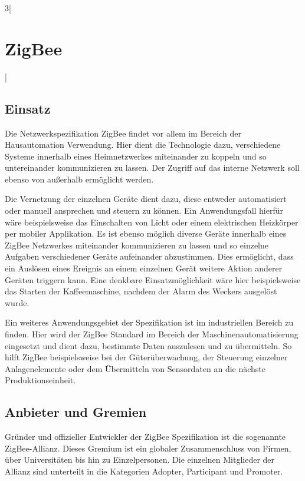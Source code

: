 \begin{multicols}{3}[\section{ZigBee}]
\subsection*{Einsatz}
Die Netzwerkspezifikation ZigBee findet vor allem im Bereich der Hausautomation Verwendung. Hier dient die Technologie dazu, verschiedene Systeme innerhalb eines Heimnetzwerkes miteinander zu koppeln und so untereinander kommunizieren zu lassen. Der Zugriff auf das interne Netzwerk soll ebenso von außerhalb ermöglicht werden. 
\par Die Vernetzung der einzelnen Geräte dient dazu, diese entweder automatisiert oder manuell ansprechen und steuern zu können. Ein Anwendungsfall hierfür wäre beispielsweise das Einschalten von Licht oder einem elektrischen Heizkörper per mobiler Applikation. Es ist ebenso möglich diverse Geräte innerhalb eines ZigBee Netzwerkes miteinander kommunizieren zu lassen und so einzelne Aufgaben verschiedener Geräte aufeinander abzustimmen. Dies ermöglicht, dass ein Auslösen eines Ereignis an einem einzelnen Gerät weitere Aktion anderer Geräten triggern kann. Eine denkbare Einsatzmöglichkeit wäre hier beispielsweise das Starten der Kaffeemaschine, nachdem der Alarm des Weckers ausgelöst wurde.  
\par Ein weiteres Anwendungsgebiet der Spezifikation ist im industriellen Bereich zu finden. Hier wird der ZigBee Standard im Bereich der Maschinenautomatisierung eingesetzt und dient dazu, bestimmte Daten auszulesen und zu übermitteln. So hilft ZigBee beispielsweise bei der Güterüberwachung, der Steuerung einzelner Anlagenelemente oder dem Übermitteln von Sensordaten an die nächste Produktionseinheit.~\cite{zigbee.10}

\subsection*{Anbieter und Gremien}
Gründer und offizieller Entwickler der ZigBee Spezifikation ist die sogenannte ZigBee-Allianz. Dieses Gremium ist ein globaler Zusammenschluss von Firmen, über Universitäten bis hin zu Einzelpersonen. Die einzelnen Mitglieder der Allianz sind unterteilt in die Kategorien Adopter, Participant und Promoter.


\end{multicols}
\newpage
